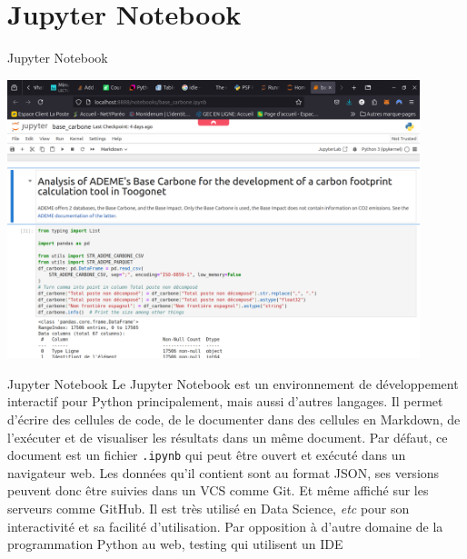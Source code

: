 \documentclass{beamer}
\begin{document}
    \section{Jupyter Notebook}
    \begin{frame}{Jupyter Notebook}
        \begin{center}
            \includegraphics[width=12cm]{image/jupyter-notebook}
        \end{center}
    \end{frame}

    \begin{frame}{Jupyter Notebook}
        Le Jupyter Notebook est un environnement de développement interactif pour Python principalement, mais aussi d'autres langages.
        \bigbreak
        Il permet d'écrire des cellules de code, de le documenter dans des cellules en Markdown, de l'exécuter et de visualiser les résultats dans un même document.
        Par défaut, ce document est un fichier \lstinline{.ipynb} qui peut être ouvert et exécuté dans un navigateur web.
        Les données qu'il contient sont au format JSON, ses versions peuvent donc être suivies dans un VCS comme Git.
        Et même affiché sur les serveurs comme GitHub.
        \bigbreak
        Il est très utilisé en Data Science, \textit{etc} pour son interactivité et sa facilité d'utilisation.
        Par opposition à d'autre domaine de la programmation Python au web, testing qui utilisent un IDE
    \end{frame}
\end{document}
